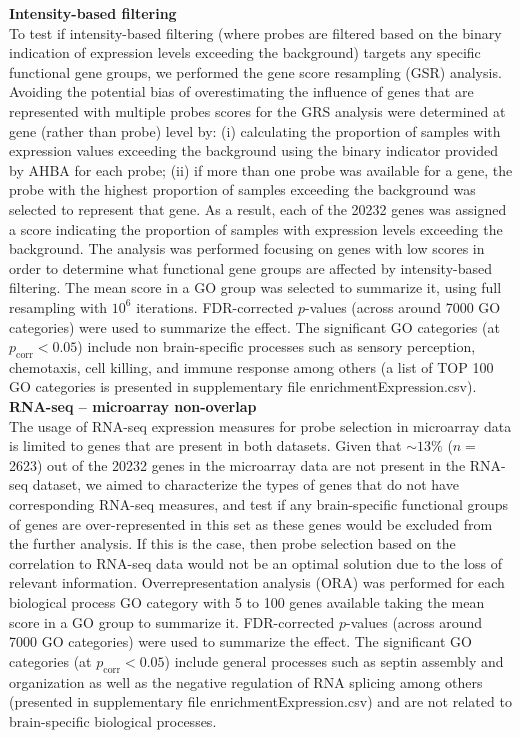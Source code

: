 \textbf{Intensity-based filtering}\\
To test if intensity-based filtering (where probes are filtered based on the binary indication of expression levels exceeding the background) targets any specific functional gene groups, we performed the gene score resampling (GSR) analysis. Avoiding the potential bias of overestimating the influence of genes that are represented with multiple probes scores for the GRS analysis were determined at gene (rather than probe) level by: (i) calculating the proportion of samples with expression values exceeding the background using the binary indicator provided by AHBA for each probe; (ii) if more than one probe was available for a gene, the probe with the highest proportion of samples exceeding the background was selected to represent that gene. As a result, each of the \num{20232} genes was assigned a score indicating the proportion of samples with expression levels exceeding the background. The analysis was performed focusing on genes with low scores in order to determine what functional gene groups are affected by intensity-based filtering. The mean score in a GO group was selected to summarize it, using full resampling with $10^{6}$ iterations. FDR-corrected $p$-values (across around \num{7000} GO categories) were used to summarize the effect. The significant GO categories (at $p_\mathrm{corr}<0.05$) include non brain-specific processes such as sensory perception, chemotaxis, cell killing, and immune response among others (a list of TOP 100 GO categories is presented in supplementary file enrichmentExpression.csv). \\

\textbf{RNA-seq – microarray non-overlap}\\
The usage of RNA-seq expression measures for probe selection in microarray data is limited to genes that are present in both datasets. Given that $\sim13\%$ ($n=$\num{2623}) out of the  \num{20232} genes in the microarray data are not present in the RNA-seq dataset, we aimed to characterize the types of genes that do not have corresponding RNA-seq measures, and test if any brain-specific functional groups of genes are over-represented in this set as these genes would be excluded from the further analysis. If this is the case, then probe selection based on the correlation to RNA-seq data would not be an optimal solution due to the loss of relevant information. Overrepresentation analysis (ORA) was performed for each biological process GO category with 5 to 100 genes available taking the mean score in a GO group to summarize it. FDR-corrected $p$-values (across around \num{7000} GO categories) were used to summarize the effect. The significant GO categories (at $p_\mathrm{corr}<0.05$) include general processes such as septin assembly and organization as well as the negative regulation of RNA splicing among others (presented in supplementary file enrichmentExpression.csv) and are not related to brain-specific biological processes. \\

